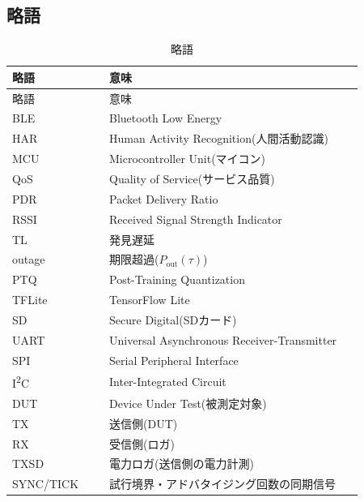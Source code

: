 \subsection{略語}
\begin{longtable}{p{0.26\linewidth}p{0.68\linewidth}}
  \caption{略語}\label{tab:acronyms}\\
  \toprule
  略語 & 意味 \\
  \midrule
  \endfirsthead
  \toprule
  略語 & 意味 \\
  \midrule
  \endhead
  BLE & Bluetooth Low Energy \\
  HAR & Human Activity Recognition(人間活動認識) \\
  MCU & Microcontroller Unit(マイコン) \\
  QoS & Quality of Service(サービス品質) \\
  PDR & Packet Delivery Ratio \\
  RSSI & Received Signal Strength Indicator \\
  TL & 発見遅延 \\
  outage & 期限超過($P_{\mathrm{out}}(\tau)$) \\
  PTQ & Post-Training Quantization \\
  TFLite & TensorFlow Lite \\
  SD & Secure Digital(SDカード) \\
  UART & Universal Asynchronous Receiver-Transmitter \\
  SPI & Serial Peripheral Interface \\
  I\textsuperscript{2}C & Inter-Integrated Circuit \\
  DUT & Device Under Test(被測定対象) \\
  TX & 送信側(DUT) \\
  RX & 受信側(ロガ) \\
  TXSD & 電力ロガ(送信側の電力計測) \\
  SYNC/TICK & 試行境界・アドバタイジング回数の同期信号 \\
  \bottomrule
\end{longtable}


